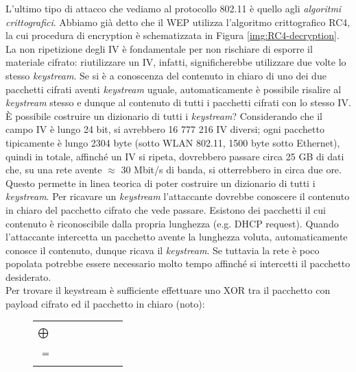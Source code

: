 L'ultimo tipo di attacco che vediamo al protocollo 802.11 è quello agli \textit{algoritmi crittografici}. Abbiamo già detto che il WEP utilizza l'algoritmo crittografico RC4, la cui procedura di encryption è schematizzata in Figura \ref{img:RC4-decryption}. La non ripetizione degli IV è fondamentale per non rischiare di esporre il materiale cifrato: riutilizzare un IV, infatti, significherebbe utilizzare due volte lo stesso \textit{keystream}. Se si è a conoscenza del contenuto in chiaro di uno dei due pacchetti cifrati aventi \textit{keystream} uguale, automaticamente è possibile risalire al \textit{keystream} stesso e dunque al contenuto di tutti i pacchetti cifrati con lo stesso IV. È possibile costruire un dizionario di tutti i \textit{keystream}? Considerando che il campo IV è lungo 24 bit, si avrebbero 16 777 216 IV diversi; ogni pacchetto tipicamente è lungo 2304 byte (sotto WLAN 802.11, 1500 byte sotto Ethernet), quindi in totale, affinché un IV si ripeta, dovrebbero passare circa 25 GB di dati che, su una rete avente $\approx$ 30 Mbit/s di banda, si otterrebbero in circa due ore. Questo permette in linea teorica di poter costruire un dizionario di tutti i \textit{keystream}. Per ricavare un \textit{keystream} l'attaccante dovrebbe conoscere il contenuto in chiaro del pacchetto cifrato che vede passare. Esistono dei pacchetti il cui contenuto è riconoscibile dalla propria lunghezza (e.g. DHCP request). Quando l'attaccante intercetta un pacchetto avente la lunghezza voluta, automaticamente conosce il contenuto, dunque ricava il \textit{keystream}. Se tuttavia la rete è poco popolata potrebbe essere necessario molto tempo affinché si intercetti il pacchetto desiderato.\\
Per trovare il keystream è sufficiente effettuare uno XOR tra il pacchetto con payload cifrato ed il pacchetto in chiaro (noto):
\begin{figure}[htbp]
	\centering
	\begin{tabular}{r}
		{\begin{bytefield}{24}\bitbox{8}{Header}\bitbox{16}{Payload cifrato}\end{bytefield}}\\
		$\bigoplus\hspace{2.5cm}$\\
		{\begin{bytefield}{16}\bitbox{16}{Pacchetto in chiaro (noto)}\end{bytefield}}\\
		$=\hspace{2.5cm}$\\
		{\begin{bytefield}{16}\bitbox{16}{Keystream}\end{bytefield}}\\
	\end{tabular}
\end{figure}\\
